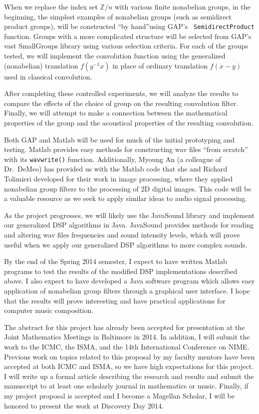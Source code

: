 \documentclass[11pt]{article}
\begin{document}
When we replace the index set $\mathbb{Z}/n$ with various finite nonabelian
groups, in the beginning, the simplest examples of nonabelian groups (such as
semidirect product groups), will be constructed ``by hand''using \acs{GAP}'s {\tt
  SemidirectProduct} function.  Groups with a more complicated structure will be
selected from \acs{GAP}'s vast SmallGroups library using various selection criteria.
For each of the groups tested, we will implement the
convolution function using the generalized (nonabelian) translation $f(y^{-1}x)$
in place of ordinary translation $f(x-y)$ used in classical convolution. 

After completing these controlled experiments, we will analyze the results to
compare the effects of the choice of group on the resulting convolution filter.
Finally, we will attempt to make a connection between the mathematical
properties of the group and the acoustical properties of the resulting
convolution.  

Both \acs{GAP} and Matlab will be used for much of the initial prototyping and
testing. Matlab provides easy methods for constructing wav files ``from 
scratch'' with its {\tt wavwrite()} function. Additionally, Myoung An (a colleague of
Dr.~DeMeo) has provided us with the Matlab code that she and Richard Tolimieri
developed for their work in image processing, where they applied nonabelian group
filters to the processing of 2D digital images. This code will be a valuable
resource as we seek to apply similar ideas to audio signal processing.  

As the project progresses, we will likely use the JavaSound library and
implement our generalized \ac{DSP} algorithms in Java.  JavaSound provides methods
for reading and altering wav files frequencies and sound intensity levels, which
will prove useful when we apply our generalized \ac{DSP} algorithms to more complex
sounds.

\vskip5mm


By the end of the Spring 2014 semester, I expect to have written Matlab programs
to test the results of the modified \ac{DSP} implementations described above.  I also
expect to have developed a Java software program which allows easy application
of nonabelian group filters through a graphical user interface.  I hope that the
results will prove interesting and have practical applications for computer
music composition.  

The abstract for this project has already been accepted for presentation at the
Joint Mathematics Meetings in Baltimore in 2014.  In addition, I will submit the
work to the \ac{ICMC}, the \ac{ISMA}, and the 14th International
Conference on \ac{NIME}. Previous work on
topics related to this proposal by my faculty mentors have been accepted at both
ICMC and ISMA,
 so we have high expectations for this project. I will write up a formal article 
describing the research and results and submit the manuscript to at least
one scholarly journal in mathematics or music. Finally, if my project proposal
is accepted and I become a Magellan Scholar, I will be honored to present the
work at Discovery Day 2014.   
\end{document}
